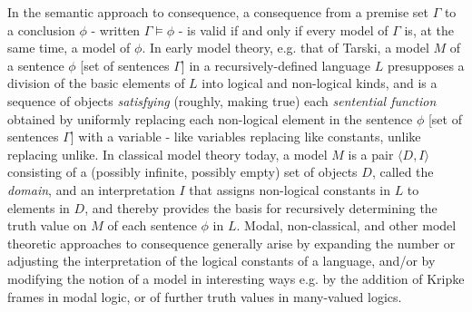 \documentclass[]{article}
\begin{document}
In the semantic approach to consequence, a consequence from a premise set $\Gamma$ to a conclusion $\phi$ - written $\Gamma \vDash \phi$ - is valid if and only if every model of $\Gamma$ is, at the same time, a model of $\phi$. In early model theory, e.g. that of Tarski, a model $M$ of a sentence $\phi$ [set of sentences $\Gamma$] in a recursively-defined language $L$ presupposes a division of the basic elements of $L$ into logical and non-logical kinds, and is a sequence of objects \textit{satisfying} (roughly, making true) each \textit{sentential function} obtained by uniformly replacing each non-logical element in the sentence $\phi$ [set of sentences $\Gamma$] with a variable - like variables replacing like constants, unlike replacing unlike. In classical model theory today, a model $M$ is a pair $\langle D,  I \rangle$ consisting of a (possibly infinite, possibly empty) set of objects $D$, called the \textit{domain}, and an interpretation $I$ that assigns non-logical constants in $L$ to elements in $D$, and thereby provides the basis for recursively determining the truth value on $M$ of each sentence $\phi$ in $L$. Modal, non-classical, and other model theoretic approaches to consequence generally arise by expanding the number or adjusting the interpretation of the logical constants of a language, and/or by modifying the notion of a model in interesting ways e.g. by the addition of Kripke frames in modal logic, or of further truth values in many-valued logics.
\end{document}
